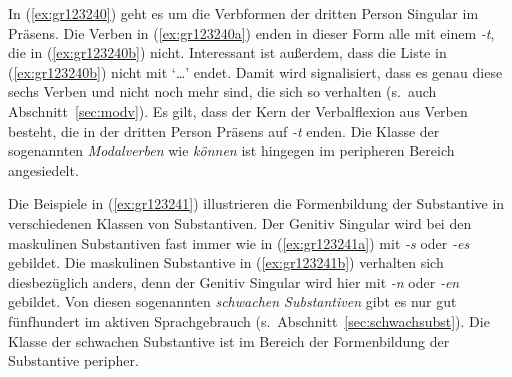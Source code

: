 
In (\ref{ex:gr123240}) geht es um die Verbformen der dritten Person Singular im Präsens.
Die Verben in (\ref{ex:gr123240a}) enden in dieser Form alle mit einem \textit{-t}, die in (\ref{ex:gr123240b}) nicht.
Interessant ist außerdem, dass die Liste in (\ref{ex:gr123240b}) nicht mit `\textit{\ldots}' endet.
Damit wird signalisiert, dass es genau diese sechs Verben und nicht noch mehr sind, die sich so verhalten (s.\ auch Abschnitt~\ref{sec:modv}).
Es gilt, dass der Kern der Verbalflexion aus Verben besteht, die in der dritten Person Präsens auf \textit{-t} enden.
Die Klasse der sogenannten \textit{Modalverben} wie \textit{können} ist hingegen im peripheren Bereich angesiedelt.


Die Beispiele in (\ref{ex:gr123241}) illustrieren die Formenbildung der Substantive in verschiedenen Klassen von Substantiven.
Der Genitiv Singular wird bei den maskulinen Substantiven fast immer wie in (\ref{ex:gr123241a}) mit \textit{-s} oder \textit{-es} gebildet.
Die maskulinen Substantive in (\ref{ex:gr123241b}) verhalten sich diesbezüglich anders, denn der Genitiv Singular wird hier mit \textit{-n} oder \textit{-en} gebildet.
Von diesen sogenannten \textit{schwachen Substantiven} gibt es nur gut fünfhundert im aktiven Sprachgebrauch (s.\ Abschnitt~\ref{sec:schwachsubst}).
Die Klasse der schwachen Substantive ist im Bereich der Formenbildung der Substantive peripher.


